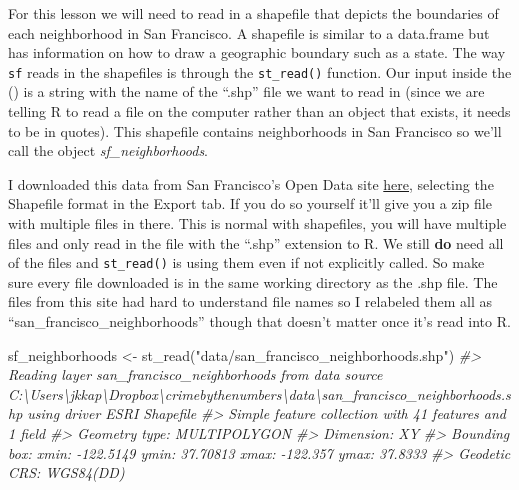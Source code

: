 \documentclass[
  12pt,
  openany]{book}
\newenvironment{Shaded}{\begin{snugshade}}{\end{snugshade}}
\newcommand{\CommentTok}[1]{\textcolor[rgb]{0.37,0.37,0.37}{\textit{#1}}}
\newcommand{\FunctionTok}[1]{\textcolor[rgb]{0,0,0}{#1}}
\newcommand{\NormalTok}[1]{#1}
\newcommand{\OtherTok}[1]{\textcolor[rgb]{0.37,0.37,0.37}{#1}}
\newcommand{\StringTok}[1]{\textcolor[rgb]{0.5,0.5,0.5}{#1}}
\begin{document}
For this lesson we will need to read in a shapefile that depicts the boundaries of each neighborhood in San Francisco. A shapefile is similar to a data.frame but has information on how to draw a geographic boundary such as a state. The way \texttt{sf} reads in the shapefiles is through the \texttt{st\_read()} function. Our input inside the () is a string with the name of the ``.shp'' file we want to read in (since we are telling R to read a file on the computer rather than an object that exists, it needs to be in quotes). This shapefile contains neighborhoods in San Francisco so we'll call the object \emph{sf\_neighborhoods}.

I downloaded this data from San Francisco's Open Data site \href{https://data.sfgov.org/Geographic-Locations-and-Boundaries/Analysis-Neighborhoods/p5b7-5n3h}{here}, selecting the Shapefile format in the Export tab. If you do so yourself it'll give you a zip file with multiple files in there. This is normal with shapefiles, you will have multiple files and only read in the file with the ``.shp'' extension to R. We still \textbf{do} need all of the files and \texttt{st\_read()} is using them even if not explicitly called. So make sure every file downloaded is in the same working directory as the .shp file. The files from this site had hard to understand file names so I relabeled them all as ``san\_francisco\_neighborhoods'' though that doesn't matter once it's read into R.

\begin{Shaded}
\begin{Highlighting}[]
\NormalTok{sf\_neighborhoods }\OtherTok{\textless{}{-}} \FunctionTok{st\_read}\NormalTok{(}\StringTok{"data/san\_francisco\_neighborhoods.shp"}\NormalTok{)}
\CommentTok{\#\textgreater{} Reading layer \textasciigrave{}san\_francisco\_neighborhoods\textquotesingle{} from data source \textasciigrave{}C:\textbackslash{}Users\textbackslash{}jkkap\textbackslash{}Dropbox\textbackslash{}crimebythenumbers\textbackslash{}data\textbackslash{}san\_francisco\_neighborhoods.shp\textquotesingle{} using driver \textasciigrave{}ESRI Shapefile\textquotesingle{}}
\CommentTok{\#\textgreater{} Simple feature collection with 41 features and 1 field}
\CommentTok{\#\textgreater{} Geometry type: MULTIPOLYGON}
\CommentTok{\#\textgreater{} Dimension:     XY}
\CommentTok{\#\textgreater{} Bounding box:  xmin: {-}122.5149 ymin: 37.70813 xmax: {-}122.357 ymax: 37.8333}
\CommentTok{\#\textgreater{} Geodetic CRS:  WGS84(DD)}
\end{Highlighting}
\end{Shaded}
\end{document}
